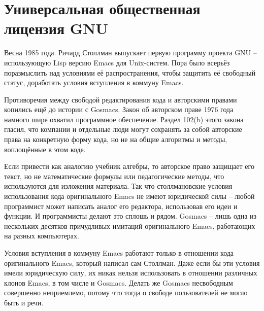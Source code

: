 

\chapter{Универсальная общественная лицензия GNU}

Весна 1985 года. Ричард Столлман выпускает первую программу проекта GNU -- использующую Lisp версию Emacs для Unix-систем. Пора было всерьёз поразмыслить над условиями её распространения, чтобы защитить её свободный статус, доработать условия вступления в коммуну Emacs.

Противоречия между свободой редактирования кода и авторскими правами копились ещё до истории с Gosmacs. Закон об авторском праве 1976 года намного шире охватил программное обеспечение. Раздел 102(b) этого закона гласил, что компании и отдельные люди могут сохранять за собой авторские права на конкретную форму кода, но не на общие алгоритмы и методы, воплощённые в этом коде. 

Если привести как аналогию учебник алгебры, то авторское право защищает его текст, но не математические формулы или педагогические методы, что используются для изложения материала. Так что столлмановские условия использования кода оригинального Emacs не имеют юридической силы -- любой программист может написать аналог его редактора, использовав его идеи и функции. И программисты делают это сплошь и рядом. Gosmacs -- лишь одна из нескольких десятков причудливых имитаций оригинального Emacs, работающих на разных компьютерах.

Условия вступления в коммуну Emacs работают только в отношении кода оригинального Emacs, который написал сам Столлман. Даже если бы эти условия имели юридическую силу, их никак нельзя использовать в отношении различных клонов Emacs, в том числе и Gosmacs. Делать же Gosmacs несвободным совершенно неприемлемо, потому что тогда о свободе пользователей не могло быть и речи.

